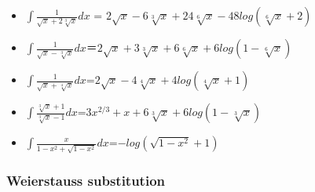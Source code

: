 \begin{itemize}
\tightlist
\item
  \(\displaystyle\int \frac{1}{\sqrt{x}+2\sqrt[3]{x}}dx\) =
  \(2\sqrt{x}-6\sqrt[3]{x}+24\sqrt[6]{x}-48log(\sqrt[6]{x}+2)\)
\item
  \(\displaystyle\int \frac{1}{\sqrt{x} - \sqrt[3]{x}}dx\)＝\(2\sqrt{x}+3\sqrt[3]{x}+6\sqrt[6]{x}+6log(1-\sqrt[6]{x})\)
\item
  \(\displaystyle\int \frac{1}{\sqrt{x} + \sqrt[4]{x}}dx\)=\(2\sqrt{x}-4\sqrt[4]{x}+4log(\sqrt[4]{x}+1)\)
\item
  \(\displaystyle\int \frac{\sqrt[3]{x}+1}{\sqrt[3]{x} - 1}dx\)=\(3x^{2/3}+x+6\sqrt[3]{x}+6log(1-\sqrt[3]{x})\)
\item
  \(\displaystyle\int \frac{x}{1-x^2 + \sqrt{1- x^2}}dx\)=\(-log(\sqrt{1-x^2}+1)\)
\end{itemize}

\hypertarget{weierstauss-substitution}{%
\subsubsection{Weierstauss
substitution}\label{weierstauss-substitution}}

